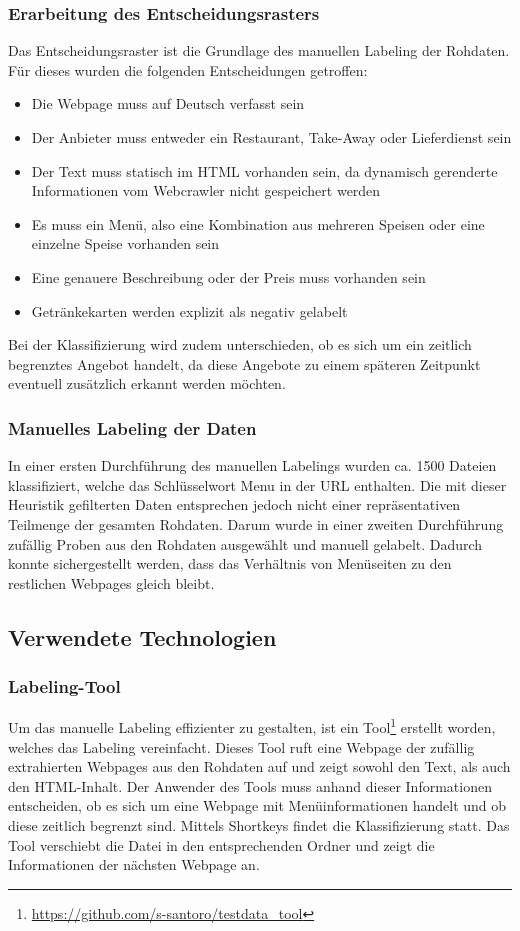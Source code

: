 \subsubsection{Erarbeitung des Entscheidungsrasters}
Das Entscheidungsraster ist die Grundlage des manuellen Labeling der Rohdaten.
Für dieses wurden die folgenden Entscheidungen getroffen:
\begin{itemize}
	\item Die Webpage muss auf Deutsch verfasst sein
	\item Der Anbieter muss entweder ein Restaurant, Take-Away oder Lieferdienst sein
	\item Der Text muss statisch im HTML vorhanden sein, da dynamisch gerenderte Informationen vom Webcrawler nicht gespeichert werden
	\item Es muss ein Menü, also eine Kombination aus mehreren Speisen oder eine einzelne Speise vorhanden sein
	\item Eine genauere Beschreibung oder der Preis muss vorhanden sein
	\item Getränkekarten werden explizit als negativ gelabelt
\end{itemize}
Bei der Klassifizierung wird zudem unterschieden, ob es sich um ein zeitlich begrenztes Angebot handelt, da diese Angebote zu einem späteren Zeitpunkt eventuell zusätzlich erkannt werden möchten.
\subsubsection{Manuelles Labeling der Daten}
In einer ersten Durchführung des manuellen Labelings wurden ca. 1500 Dateien klassifiziert, welche das Schlüsselwort \glqq Menu\grqq{} in der URL enthalten.
Die mit dieser Heuristik gefilterten Daten entsprechen jedoch nicht einer repräsentativen Teilmenge der gesamten Rohdaten.
Darum wurde in einer zweiten Durchführung zufällig Proben aus den Rohdaten ausgewählt und manuell gelabelt.
Dadurch konnte sichergestellt werden, dass das Verhältnis von Menüseiten zu den restlichen Webpages gleich bleibt.
\subsection{Verwendete Technologien}
\subsubsection{Labeling-Tool}
Um das manuelle Labeling effizienter zu gestalten, ist ein Tool\footnote{\url{https://github.com/s-santoro/testdata_tool}} erstellt worden, welches das Labeling vereinfacht.
Dieses Tool ruft eine Webpage der zufällig extrahierten Webpages aus den Rohdaten auf und zeigt sowohl den Text, als auch den HTML-Inhalt.
Der Anwender des Tools muss anhand dieser Informationen entscheiden, ob es sich um eine Webpage mit Menüinformationen handelt und ob diese zeitlich begrenzt sind.
Mittels Shortkeys findet die Klassifizierung statt.
Das Tool verschiebt die Datei in den entsprechenden Ordner und zeigt die Informationen der nächsten Webpage an.
